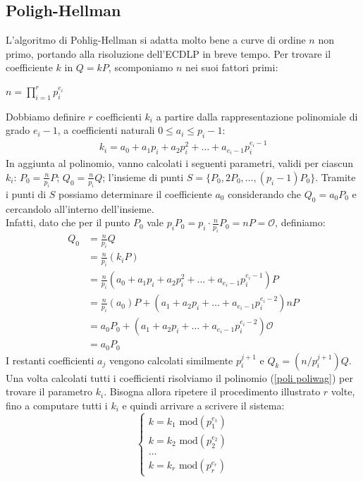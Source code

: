 \documentclass[a4paper,12pt]{tesiinfo}
\newcommand\ddfrac[2]{\frac{\displaystyle #1}{\displaystyle #2}}
\begin{document}
\subsection{Poligh-Hellman}
\label{poliwag}
L'algoritmo di Pohlig-Hellman \cite{rho for poliwag} si adatta molto bene a curve di ordine $n$ non primo, portando alla risoluzione dell'ECDLP in breve tempo. Per trovare il coefficiente $k$ in $Q=kP$, scomponiamo $n$ nei suoi fattori primi:
\begin{center}
$n={\displaystyle \prod_{i=1}^{r} p_i^{e_i}}$
\end{center}
Dobbiamo definire $r$ coefficienti $k_i$ a partire dalla rappresentazione polinomiale di grado $e_i-1$, a coefficienti naturali $0 \leq a_i \leq p_i-1$:
\begin{align}
k_i = a_0 + a_1p_i + a_2p_i^2 + \ldots + a_{e_i-1}p_i^{e_i-1}
\label{poli poliwag}
\end{align}
In aggiunta al polinomio, vanno calcolati i seguenti parametri, validi per ciascun $k_i$: $P_0 = \ddfrac{n}{p_i}P$; $Q_0 = \ddfrac{n}{p_i}Q$; l'insieme di punti $S = \{P_0, 2P_0, \ldots, (p_i-1)P_0\}$. Tramite i punti di $S$ possiamo determinare il coefficiente $a_0$ considerando che $Q_0=a_0P_0$ e cercandolo all'interno dell'insieme. 
\\
Infatti, dato che per il punto $P_0$ vale $p_iP_0=p_i \cdot \ddfrac{n}{p_i}P_0 = nP = \mathcal{O}$, definiamo:
\begin{align*}
Q_0 &= \ddfrac{n}{p_i}Q \\
&= \ddfrac{n}{p_i}(k_iP) \\
&= \ddfrac{n}{p_i}(a_0 + a_1p_i + a_2p_i^2 + \ldots + a_{e_i-1}p_i^{e_i-1})P\\
&= \ddfrac{n}{p_i}(a_0)P + (a_1 + a_2p_i + \ldots + a_{e_i-1}p_i^{e_i-2})nP\\
&= a_0P_0 + (a_1 + a_2p_i + \ldots + a_{e_i-1}p_i^{e_i-2})\mathcal{O}\\
&= a_0P_0
\end{align*}
I restanti coefficienti $a_j$ vengono calcolati similmente $p_i^{j+1}$ e $Q_k=(n \big / p_i^{j+1})Q$. Una volta calcolati tutti i coefficienti risolviamo il polinomio (\ref{poli poliwag}) per trovare il parametro $k_i$. Bisogna allora ripetere il procedimento illustrato $r$ volte, fino a computare tutti i $k_i$ e quindi arrivare a scrivere il sistema:
\begin{equation}
\begin{cases}
 k = k_1 \text{ mod}(p_1^{e_1})\\
 k = k_2 \text{ mod}(p_2^{e_2})\\
 \ldots\\
 k = k_r \text{ mod}(p_r^{e_r})
\end{cases}
\label{sistema poliwag}
\end{equation}
\end{document}
